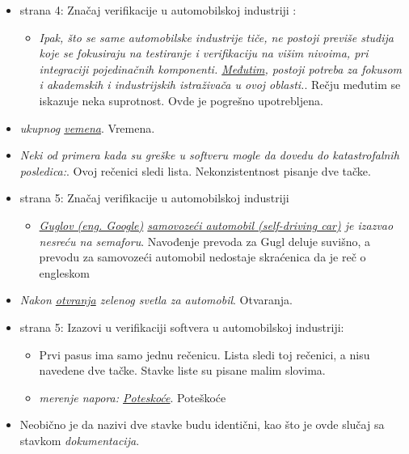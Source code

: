 \documentclass[a4paper]{report}
\begin{document}
\begin{itemize}
\item strana 4: Značaj verifikacije u automobilskoj industriji
:
  \begin{itemize}
  \item {\em{Ipak, što se same automobilske industrije tiče, ne postoji previše studija koje se fokusiraju na testiranje i verifikaciju na višim nivoima, pri integraciji pojedinačnih komponenti. {\underline{Međutim}}, postoji potreba za fokusom i akademskih i industrijskih istraživača u ovoj oblasti.}}. Rečju međutim se iskazuje neka suprotnost. Ovde je pogrešno upotrebljena.
  \end{itemize}
\item {\em{ ukupnog {\underline{vemena}}}}. Vremena.
\item {\em{Neki od primera kada su greške u softveru mogle da dovedu do katastrofalnih posledica:}}. Ovoj rečenici sledi lista. Nekonzistentnost pisanje dve tačke.
\end{itemize}
\begin{itemize}
\item strana 5: Značaj verifikacije u automobilskoj industriji
  \begin{itemize}
  \item {\em{{\underline{Guglov (eng. Google)}} {\underline{samovozeći automobil (self-driving car)}} je izazvao nesreću na semaforu}}. Navođenje prevoda za Gugl deluje suvišno, a prevodu za samovozeći automobil nedostaje skraćenica da je reč o engleskom
  \end{itemize}
\item {\em{Nakon {\underline{otvranja}} zelenog svetla za automobil}}. Otvaranja.
\end{itemize}
\begin{itemize}
\item strana 5: Izazovi u verifikaciji softvera u automobilskoj industriji:
  \begin{itemize}
  \item Prvi pasus ima samo jednu rečenicu. Lista sledi toj rečenici, a nisu navedene dve tačke. Stavke liste su pisane malim slovima.
  \item {\em{merenje napora: {\underline{Poteskoće}}}}. Poteškoće
  \end{itemize}
\item Neobično je da nazivi dve stavke budu identični, kao što je ovde slučaj sa stavkom {\em{dokumentacija}}.
\end{itemize}
\end{document}
